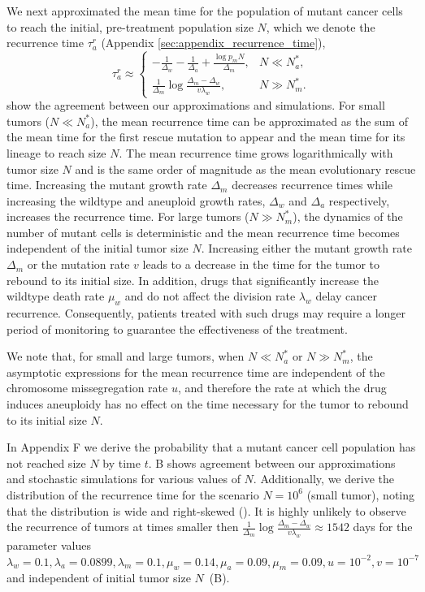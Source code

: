 \documentclass[12pt]{extarticle}
\begin{document}
We next approximated the mean time for the population of mutant cancer cells to reach the initial, pre-treatment population size $N$, which we denote the recurrence time $\tau_a^r$ (Appendix \ref{sec:appendix_recurrence_time}),
\begin{equation} \label{eq:AsymptoticTimeRulesRecurrence}
\tau_a^r \approx \begin{cases}
   -\frac{1}{\Delta_w}-\frac{1}{\Delta_a}+\frac{\log p_mN}{\Delta_m} ,&
 N \ll N_a^* ,\\ 
  \frac{1}{\Delta_m}\log\frac{\Delta_m-\Delta_w}{v\lambda_w}  ,&
  N \gg N_m^* .
  \end{cases}
\end{equation}
 show the agreement between our approximations and simulations.
For small tumors ($N \ll N_a^*$), the mean recurrence time can be approximated as the sum of the mean time for the first rescue mutation to appear and the mean time for its lineage to reach size $N$. The mean recurrence time grows logarithmically with tumor size $N$ and is the same order of magnitude as the mean evolutionary rescue time. Increasing the mutant growth rate $\Delta_m$ decreases recurrence times while increasing the wildtype and aneuploid growth rates, $\Delta_w$ and $\Delta_a$ respectively, increases the recurrence time.
For large tumors ($N \gg N_m^*$), the dynamics of the number of mutant cells is deterministic and the mean recurrence time becomes independent of the initial tumor size $N$.
Increasing either the mutant growth rate $\Delta_m$ or the mutation rate $v$ leads to a decrease in the time for the tumor to rebound to its initial size.
In addition, drugs that significantly increase the wildtype death rate $\mu_w$ and do not affect the division rate $\lambda_w$ delay cancer recurrence.
Consequently, patients treated with such drugs may require a longer period of monitoring to guarantee the effectiveness of the treatment. 

We note that, for small and large tumors, when $N \ll N_a^*$ or $N \gg N_m^*$, the asymptotic expressions for the mean recurrence time are independent of the chromosome missegregation rate $u$, and therefore the rate at which the drug induces aneuploidy has no effect on the time necessary for the tumor to rebound to its initial size $N$.

In Appendix F we derive the probability that a mutant cancer cell population has not reached size $N$ by time $t$. B shows agreement between our approximations and stochastic simulations for various values of $N$. Additionally, we derive the distribution of the recurrence time for the scenario $N=10^6$ (small tumor), noting that the distribution is wide and right-skewed (). It is highly unlikely to observe the recurrence of tumors at times smaller then $\frac{1}{\Delta_m}\log\frac{\Delta_m-\Delta_w}{v\lambda_w}\approx1542$ days for the parameter values $\lambda_w=0.1, \lambda_a=0.0899,\lambda_m=0.1,\mu_w=0.14,\mu_a=0.09,\mu_m=0.09, u=10^{-2}, v=10^{-7}$ and independent of initial tumor size $N$~(B). 
\end{document}
